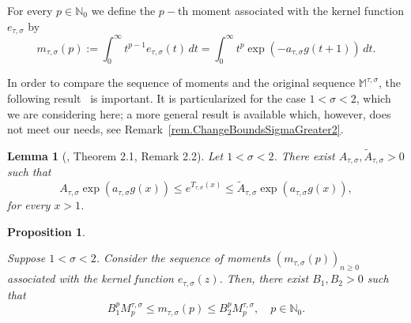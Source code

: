\documentclass[12pt,leqno]{amsart}
\theoremstyle{plain}
\newtheorem{lemma}[theo]{Lemma}
\newtheorem{prop}[theo]{Proposition}
\theoremstyle{definition}
\numberwithin{equation}{section}
\def\M{\mathbb{M}}
\begin{document}
For every $p\in\mathbb{N}_0$ we define the $p-$th moment associated with the kernel function $e_{\tau,\sigma}$ by
$$m_{\tau,\sigma}(p):=\int_0^\infty t^{p-1}e_{\tau,\sigma}(t)\,dt=
\int_0^\infty t^p\exp\left(-a_{\tau,\sigma} g(t+1)\right)\,dt.$$

In order to compare the sequence of moments and the original sequence $\M^{\tau,\sigma}$, the following result~\cite[Theorem~2.1]{ptt} is important. It is particularized for the case $1<\sigma<2$, which we are considering here; a more general result is available which, however, does not meet our needs, see Remark~\ref{rem.ChangeBoundsSigmaGreater2}.

\begin{lemma}[\cite{ptt}, Theorem 2.1, Remark 2.2]\label{lema.doubleEstimatesSerbian}
Let $1<\sigma<2$.
There exist $A_{\tau,\sigma},\tilde{A}_{\tau,\sigma}>0$ such that
\begin{equation}\label{eq.doubleEstimatesSerbian}
A_{\tau,\sigma}\exp(a_{\tau,\sigma}g(x))\le e^{T_{\tau,\sigma}(x)}\le \tilde{A}_{\tau,\sigma}\exp(a_{\tau,\sigma}g(x)),
\end{equation}
for every $x>1$.
\end{lemma}


\begin{prop}\label{prop.boundsMomentsSigmaEntre1y2}

Suppose $1<\sigma<2$. Consider the sequence of moments $(m_{\tau,\sigma}(p))_{n\ge0}$ associated with the kernel function $e_{\tau,\sigma}(z)$. Then, there exist $B_1,B_2>0$ such that
\begin{equation}\label{eq.boundsMmomentsdc}
B_1^{p}M_p^{\tau,\sigma}\le m_{\tau,\sigma}(p)\le B_2^{p}M_p^{\tau,\sigma},\quad p\in\mathbb{N}_0.
\end{equation}
\end{prop}
\end{document}
